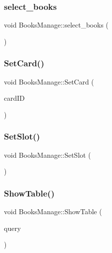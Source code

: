 \subsubsection{\texorpdfstring{select\_books}{select\_books}}
{\footnotesize\ttfamily void Books\+Manage\+::select\+\_\+books (\begin{DoxyParamCaption}{ }\end{DoxyParamCaption})\hspace{0.3cm}{\ttfamily [slot]}}

\mbox{\label{class_books_manage_a009c231a6f8976be927b7acfdc4d4591}} 
\subsubsection{\texorpdfstring{SetCard()}{SetCard()}}
{\footnotesize\ttfamily void Books\+Manage\+::\+Set\+Card (\begin{DoxyParamCaption}\item[{Q\+String}]{card\+ID }\end{DoxyParamCaption})}

\mbox{\label{class_books_manage_a0ee0a3e432c7789497c17758d1f82fdf}} 
\subsubsection{\texorpdfstring{SetSlot()}{SetSlot()}}
{\footnotesize\ttfamily void Books\+Manage\+::\+Set\+Slot (\begin{DoxyParamCaption}{ }\end{DoxyParamCaption})}

\mbox{\label{class_books_manage_abbacf5e112bdee769aaa4d22c0e14744}} 
\subsubsection{\texorpdfstring{ShowTable()}{ShowTable()}}
{\footnotesize\ttfamily void Books\+Manage\+::\+Show\+Table (\begin{DoxyParamCaption}\item[{Q\+Sql\+Query}]{query }\end{DoxyParamCaption})}

